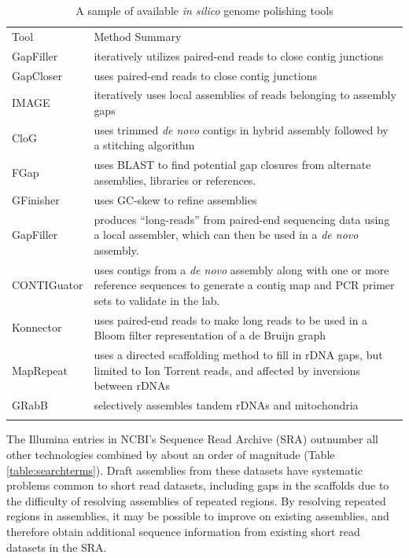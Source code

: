 \documentclass[10pt]{article}
\makeatletter
\newcommand{\ra}[1]{\renewcommand{\arraystretch}{#1}}
\newcommand{\cmidrules}[1]{%
  \noalign{%
    \global\MD@cmidrules={}%
    \toks@={\cmidrule(l{.3\tabcolsep}r{.3\tabcolsep})}%
    \count@=\z@
    \loop\ifnum\count@<#1\relax
      \advance\count@\@ne
      \edef\MD@temp{\the\toks@{\the\count@-\the\count@}}%
      \global\MD@cmidrules\expandafter{\the\expandafter\MD@cmidrules\MD@temp}%
    \repeat
  }%
  \the\MD@cmidrules
}
\makeatother
\begin{document}
\begin{linenumbers}
\begin{table}[!h]
\centering
\ra{1.3}
\caption{A sample of available \textit{\textit{in silico}} genome polishing tools}
\label{table:tools}
\begin{tabular}{p{2.6cm}p{11cm}}
  \toprule
  Tool &  Method Summary \\
  \cmidrules{2}
  GapFiller\cite{Boetzer2012} & iteratively utilizes paired-end reads to close contig junctions \\
    \arrayrulecolor{lgray}\hline
  GapCloser\cite{Luo2012} & uses paired-end reads to close contig junctions \\
  \hline
  IMAGE \cite{Tsai2010} & iteratively uses local assemblies of reads belonging to  assembly gaps \\
  \hline
  CloG \cite{Yang2011} & uses trimmed \textit{de novo} contigs in hybrid assembly followed by a stitching algorithm \\
  \hline
  FGap \cite{Piro2014,Guizelini2016} & uses BLAST to find potential gap closures from alternate assemblies, libraries or references. \\
  \hline
  GFinisher \cite{Guizelini2016} & uses GC-skew to refine assemblies \\
  \hline
  GapFiller \cite{Nadalin2012} &  produces ``long-reads'' from paired-end sequencing data using a local assembler, which can then be used in a \textit{de novo} assembly. \\
  \hline
  CONTIGuator\cite{Galardini2011} & uses contigs from a \textit{de novo} assembly along with one or more reference sequences to generate a contig map and PCR primer sets to validate in the lab. \\
  \hline
  Konnector\cite{Vandervalk2015} & uses paired-end reads to make long reads to be used in a Bloom filter representation of a de Bruijn graph \\
  \hline
  MapRepeat\cite{Mariano2015} & uses a directed scaffolding method to fill in rDNA gaps, but limited to Ion Torrent reads, and affected by inversions between rDNAs \cite{Mariano2016} \\
  \hline
  GRabB\cite{Brankovics2016} & selectively assembles tandem rDNAs and mitochondria\\
    \arrayrulecolor{black}
  \bottomrule
\end{tabular}
\end{table}



The Illumina entries in NCBI's Sequence Read Archive (SRA) \cite{Kodama2012a} outnumber all other technologies combined by about an order of magnitude (Table \ref{table:searchterms}). Draft assemblies from these datasets have systematic problems common to short read datasets, including gaps in the scaffolds due to the difficulty of resolving assemblies of repeated regions\cite{Whiteford2005,Treangen2011}. By resolving repeated regions in assemblies, it may be possible to improve on existing assemblies, and therefore obtain additional sequence information from existing short read datasets in the SRA.




\end{linenumbers}
\end{document}
